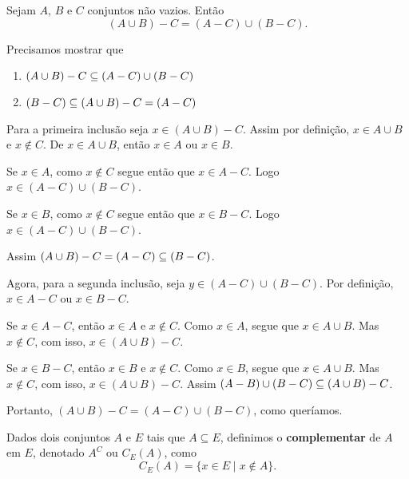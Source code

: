 \begin{proposicao}
    Sejam $A$, $B$ e $C$ conjuntos não vazios. Então
    \[
        (A \cup B) - C = (A - C) \cup (B - C).
    \]
\end{proposicao}
\begin{prova}
    Precisamos mostrar que
    \begin{enumerate}[label={\arabic*})]
        \item $(A \cup B) - C \subseteq (A - C) \cup (B - C)$
        \item $(B - C) \subseteq (A \cup B) - C = (A - C)$
    \end{enumerate}
    Para a primeira inclusão seja $x \in (A \cup B) - C$. Assim por definição, $x \in A \cup B$ e $x \notin C$. De $x \in A \cup B$, então $x \in A$ ou $x \in B$.

    Se $x \in A$, como $x \notin C$ segue então que $x \in A - C$. Logo $x \in (A - C) \cup (B - C)$.

    Se $x \in B$, como $x \notin C$ segue então que $x \in B - C$. Logo $x \in (A - C) \cup (B - C)$.

    Assim $(A \cup B) - C = (A - C) \subseteq (B - C)$.

    Agora, para a segunda inclusão, seja $y \in (A - C) \cup (B - C)$. Por definição, $x \in A - C$ ou $x \in B - C$.

    Se $x \in A - C$, então $x \in A$ e $x \notin C$. Como $x \in A$, segue que $x \in A \cup B$. Mas $x \notin C$, com isso, $x \in (A \cup B) - C$.

    Se $x \in B - C$, então $x \in B$ e $x \notin C$. Como $x \in B$, segue que $x \in A \cup B$. Mas $x \notin C$, com isso, $x \in (A \cup B) - C$.
    Assim $(A - B) \cup (B - C) \subseteq (A \cup B) - C$.

    Portanto, $(A \cup B) - C = (A - C) \cup (B - C)$, como queríamos.
\end{prova}

\begin{definicao}
    Dados dois conjuntos $A$ e $E$ tais que $A\subseteq E$, definimos o \textbf{complementar} de $A$ em $E$, denotado $A^C$ ou $C_E(A)$, como
    \[
        C_E(A) = \{ x \in E \mid x \notin A \}.
    \]

\end{definicao}

